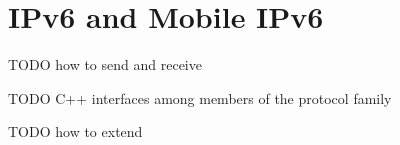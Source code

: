 \chapter{IPv6 and Mobile IPv6}
\label{cha:ipv6}

TODO how to send and receive

TODO C++ interfaces among members of the protocol family

TODO how to extend


